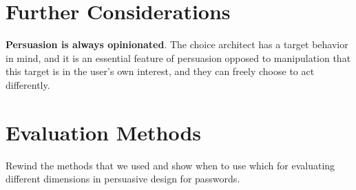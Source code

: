 \section{Further Considerations}

\textbf{Persuasion is always opinionated}. The choice architect has a target behavior in mind, and it is an essential feature of persuasion opposed to manipulation that this target is in the user's own interest, and they can freely choose to act differently. 


\section{Evaluation Methods}
Rewind the methods that we used and show when to use which for evaluating different dimensions in persuasive design for passwords. 


